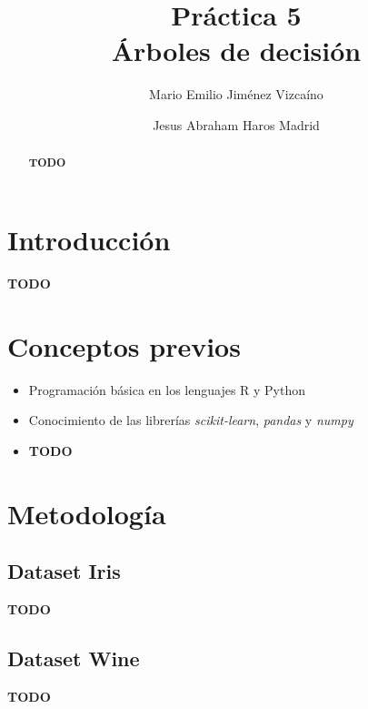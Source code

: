 \documentclass[sigconf,authorversion,nonacm]{acmart}
\begin{document}
\title{Práctica 5 \\ Árboles de decisión}

\author{Mario Emilio Jiménez Vizcaíno}

\author{Jesus Abraham Haros Madrid}


\begin{abstract}
  \textbf{TODO}
\end{abstract}

\maketitle

\section{Introducción}
\textbf{TODO}

\section{Conceptos previos}
\begin{itemize}
  \item Programación básica en los lenguajes R y Python
  \item Conocimiento de las librerías \textit{scikit-learn}, \textit{pandas} y \textit{numpy}
  \item \textbf{TODO}
\end{itemize}


\section{Metodología}

\subsection{Dataset Iris}
\textbf{TODO}

\subsection{Dataset Wine}
\textbf{TODO}
\end{document}
